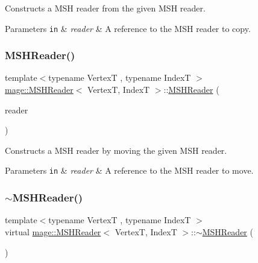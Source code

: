 Constructs a M\+SH reader from the given M\+SH reader.


\begin{DoxyParams}[1]{Parameters}
\mbox{\tt in}  & {\em reader} & A reference to the M\+SH reader to copy. \\
\hline
\end{DoxyParams}
\hypertarget{classmage_1_1_m_s_h_reader_accf271938e9a389e7940a20352b60c0c}{}\label{classmage_1_1_m_s_h_reader_accf271938e9a389e7940a20352b60c0c} 
\subsubsection{\texorpdfstring{M\+S\+H\+Reader()}{MSHReader()}\hspace{0.1cm}{\footnotesize\ttfamily [3/3]}}
{\footnotesize\ttfamily template$<$typename VertexT , typename IndexT $>$ \\
\hyperlink{classmage_1_1_m_s_h_reader}{mage\+::\+M\+S\+H\+Reader}$<$ VertexT, IndexT $>$\+::\hyperlink{classmage_1_1_m_s_h_reader}{M\+S\+H\+Reader} (\begin{DoxyParamCaption}\item[{\hyperlink{classmage_1_1_m_s_h_reader}{M\+S\+H\+Reader}$<$ VertexT, IndexT $>$ \&\&}]{reader }\end{DoxyParamCaption})\hspace{0.3cm}{\ttfamily [noexcept]}}

Constructs a M\+SH reader by moving the given M\+SH reader.


\begin{DoxyParams}[1]{Parameters}
\mbox{\tt in}  & {\em reader} & A reference to the M\+SH reader to move. \\
\hline
\end{DoxyParams}
\hypertarget{classmage_1_1_m_s_h_reader_a6e1f882fa81362f744f438a1f992b182}{}\label{classmage_1_1_m_s_h_reader_a6e1f882fa81362f744f438a1f992b182} 
\subsubsection{\texorpdfstring{$\sim$\+M\+S\+H\+Reader()}{~MSHReader()}}
{\footnotesize\ttfamily template$<$typename VertexT , typename IndexT $>$ \\
virtual \hyperlink{classmage_1_1_m_s_h_reader}{mage\+::\+M\+S\+H\+Reader}$<$ VertexT, IndexT $>$\+::$\sim$\hyperlink{classmage_1_1_m_s_h_reader}{M\+S\+H\+Reader} (\begin{DoxyParamCaption}{ }\end{DoxyParamCaption})\hspace{0.3cm}{\ttfamily [virtual]}}

